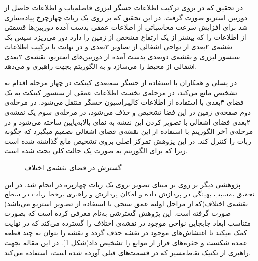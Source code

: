 در تحقیق که در  بروی ترکیب اطلاعات حسگر لیزری فاصله‌یاب و اطلاعات حاصل از دوربین استریو صورت گرفت. در این تحقیق که بر روی یک ربات چهارچرخ پیاده‌سازی شد برای افزایش سرعت محاسباتی از اطلاعات عمقی بدست آمده دوربین‌ها قسمتی از اطلاعات را که بیشتر از یک ارتفاع مشخص از زمین را دارد دور می‌ریزد سپس یک نقشه‌ی ۲بعدی از نواحی اشغالی از تصاویر ۳بعدی و در نهایت با ترکیب اطلاعات سنسور لیزری و نقشه‌ی دوبعدی بدست آمده از دوربین‌های استریو، نقشه‌ی ۲بعدی اشفالی از محیط را می‌سازد و به الگوریتم  بجهت راهبری و  می‌دهد.

در  پسلی و همکاران با استفاده از حسگر سه‌بعدی کینکت در چهار مرحله اقدام به تشخیص مانع می‌کند، در مرحله‌ی نخست اطلاعات عمقی از سنسور کینکت به یک فضای ۳بعدی با استفاده از اطلاعات کالیبراسیون حسگر منتقل می‌شود. در مرحله‌ی دوم صفحه‌ی زمین در این فضا تشخیص و حذف می‌شود، در مرحله‌ی سوم یک نقشه‌ی ۲بعدی فضای اشغالی با تصویر کردن این نقشه به نمای بالابه‌پایین ساخته می‌شود و در مرحله‌ی آخر الگوریتم  با استفاده از این نقشه‌ی فضای اشغالی تصمیم میگیرد که چگونه ربات را کنترل کند. در این پژوهش تمرکز اصلی بروی تشخیص مانع گذاشته شده است زیرا که برای الگوریتم  به صورت یک حالت کلی بحث شده است.

\begin{figure}[b]
\centering
{}
\caption{گسترش
در فضای نقشه‌ی اختلاف}
\label{fig:c_space_expansion}
\end{figure}

پژوهشی دیگر بر روی  بر مبنای تصویر بروی یک ربات چهارپره در  انجام شد. در این تحقیق  به‌سبب بهینگی در پردازش داده و امکان پردازش و راهبری برخط ربات در سطح نقشه‌ی اختلاف(که از مراحل اولیه عمق سنجی با استفاده از تصاویر استریو می‌باشد) صورت گرفته است. این پژوهش گسترشی به‌نام  معرفی کرده است که بصورت متناسب ابعاد جابجایی نواحی موجود در نقشه‌ی اختلاف را گسترده می‌کند که در نهایت کمک میکند تا اغتشاش‌های موجود در نقشه حذف گردد و نقشه را بتوان به چند قطعه عمده شکست و حفره‌های فرار از موانع را تشخیص داد(شکل \ref{fig:c_space_expansion}). در این مقاله بجهت راهبری از تکنیک نقاط‌مسیر که در قسمت‌های قبلی آورده شده است، استفاده می‌کند.

